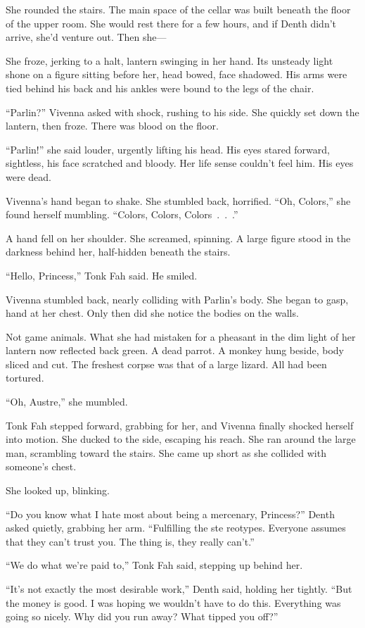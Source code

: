 She rounded the stairs. The main space of the cellar was built beneath the floor of the upper room. She would rest there for a few hours, and if Denth didn’t arrive, she’d venture out. Then she—

She froze, jerking to a halt, lantern swinging in her hand. Its unsteady light shone on a figure sitting before her, head bowed, face shadowed. His arms were tied behind his back and his ankles were bound to the legs of the chair.

“Parlin?” Vivenna asked with shock, rushing to his side. She quickly set down the lantern, then froze. There was blood on the floor.

“Parlin!” she said louder, urgently lifting his head. His eyes stared forward, sightless, his face scratched and bloody. Her life sense couldn’t feel him. His eyes were dead.

Vivenna’s hand began to shake. She stumbled back, horrified. “Oh, Colors,” she found herself mumbling. “Colors, Colors, Colors~.~.~.”

A hand fell on her shoulder. She screamed, spinning. A large figure stood in the darkness behind her, half-hidden beneath the stairs.

“Hello, Princess,” Tonk Fah said. He smiled.

Vivenna stumbled back, nearly colliding with Parlin’s body. She began to gasp, hand at her chest. Only then did she notice the bodies on the walls.

Not game animals. What she had mistaken for a pheasant in the dim light of her lantern now reflected back green. A dead parrot. A monkey hung beside, body sliced and cut. The freshest corpse was that of a large lizard. All had been tortured.

“Oh, Austre,” she mumbled.

Tonk Fah stepped forward, grabbing for her, and Vivenna finally shocked herself into motion. She ducked to the side, escaping his reach. She ran around the large man, scrambling toward the stairs. She came up short as she collided with someone’s chest.

She looked up, blinking.

“Do you know what I hate most about being a mercenary, Princess?” Denth asked quietly, grabbing her arm. “Fulfilling the ste reotypes. Everyone assumes that they can’t trust you. The thing is, they really can’t.”

“We do what we’re paid to,” Tonk Fah said, stepping up behind her.

“It’s not exactly the most desirable work,” Denth said, holding her tightly. “But the money is good. I was hoping we wouldn’t have to do this. Everything was going so nicely. Why did you run away? What tipped you off?”

